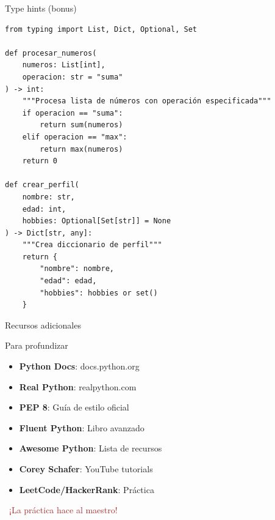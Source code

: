\documentclass{beamer}
\begin{document}
\begin{frame}[fragile]{Type hints (bonus) \faTag}
\begin{lstlisting}
from typing import List, Dict, Optional, Set

def procesar_numeros(
    numeros: List[int], 
    operacion: str = "suma"
) -> int:
    """Procesa lista de números con operación especificada"""
    if operacion == "suma":
        return sum(numeros)
    elif operacion == "max":
        return max(numeros)
    return 0

def crear_perfil(
    nombre: str, 
    edad: int, 
    hobbies: Optional[Set[str]] = None
) -> Dict[str, any]:
    """Crea diccionario de perfil"""
    return {
        "nombre": nombre,
        "edad": edad,
        "hobbies": hobbies or set()
    }
\end{lstlisting}
\end{frame}

\begin{frame}{Recursos adicionales \faBook}
\begin{conceptbox}{Para profundizar}
\small
\begin{itemize}
    \item[\faGlobe] \textbf{Python Docs}: docs.python.org
    \item[\faGlobe] \textbf{Real Python}: realpython.com
    \item[\faGlobe] \textbf{PEP 8}: Guía de estilo oficial
    \item[\faBook] \textbf{Fluent Python}: Libro avanzado
    \item[\faGithub] \textbf{Awesome Python}: Lista de recursos
    \item[\faPlayCircle] \textbf{Corey Schafer}: YouTube tutorials
    \item[\faCode] \textbf{LeetCode/HackerRank}: Práctica
\end{itemize}
\end{conceptbox}

\vspace{0.2cm}
\begin{center}
\textcolor{brown}{\faRocket\ ¡La práctica hace al maestro!}
\end{center}
\end{frame}
\end{document}
